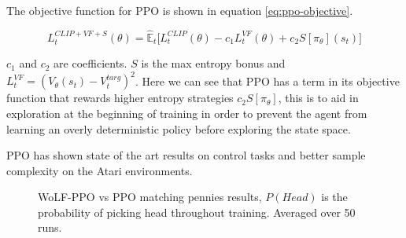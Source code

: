 \documentclass[conference]{IEEEtran}
\begin{document}
The objective function for PPO is shown in equation \ref{eq:ppo-objective}.

\begin{equation}
    L_t^{CLIP+VF+S}(\theta) = \hat{\mathbb{E}}_t\big[L_t^{CLIP}(\theta)-c_1L_t^{VF}(\theta)+c_2S[\pi_{\theta}](s_t)\big]
    \label{eq:ppo-objective}
\end{equation}

$c_1$ and $c_2$ are coefficients. $S$ is the max entropy bonus and $L_t^{VF} = (V_{\theta}(s_t)-V_t^{targ})^2$. Here we can see that PPO has a term in its objective function that rewards higher entropy strategies $c_2S[\pi_{\theta}]$, this is to aid in exploration at the beginning of training in order to prevent the agent from learning an overly deterministic policy before exploring the state space. 

PPO has shown state of the art results on control tasks and better sample complexity on the Atari environments.

\begin{figure}[htbp]
    \caption{WoLF-PPO vs PPO matching pennies results, $P(Head)$ is the probability of picking head throughout training. Averaged over 50 runs.}
\end{figure}
\end{document}
